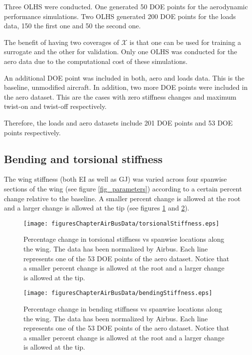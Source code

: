 Three OLHS were conducted. One generated 50 DOE points for the aerodynamic performance simulations. Two OLHS generated 200 DOE points for the loads data, 150 the first one and 50 the second one. 

The benefit of having two coverages of $\mathcal{X}$ is that one can be used for training a surrogate and the other for validation. Only one OLHS was conducted for the aero data due to the computational cost of these simulations.

An additional DOE point was included in both, aero and loads data. This is the baseline, unmodified aircraft. In addition, two more DOE points were included in the aero dataset. This are the cases with zero stiffness changes and maximum twist-on and twist-off respectively. 

Therefore, the loads and aero datasets include 201 DOE points and 53 DOE points respectively.

\subsection{Bending and torsional stiffness} \label{sec_bendingTorsionalStiffness}

The wing stiffness (both EI as well as GJ) was varied across four spanwise sections of the wing (see figure \ref{fig_parameters}) according to a certain percent change relative to the baseline. A smaller percent change is allowed at the root and a larger change is allowed at the tip (see figures \ref{fig_torsionalStiffness} and \ref{fig_bendingStiffness}).

 \begin{figure}[!htbp]
  \centering
    \texttt{[image: figuresChapterAirBusData/torsionalStiffness.eps]}
  \caption[Percentage change in torsional stiffness vs spanwise locations along the wing]%
{Percentage change in torsional stiffness vs spanwise locations along the wing. The data has been normalized by Airbus. Each line represents one of the 53 DOE points of the aero dataset. Notice that a smaller percent change is allowed at the root and a larger change is allowed at the tip.}
  \label{fig_torsionalStiffness}
\end{figure}

 \begin{figure}[!htbp]
  \centering
    \texttt{[image: figuresChapterAirBusData/bendingStiffness.eps]}
  \caption[Percentage change in bending stiffness vs spanwise locations along the wing]%
{Percentage change in bending stiffness vs spanwise locations along the wing. The data has been normalized by Airbus. Each line represents one of the 53 DOE points of the aero dataset. Notice that a smaller percent change is allowed at the root and a larger change is allowed at the tip.}
  \label{fig_bendingStiffness}
\end{figure}


